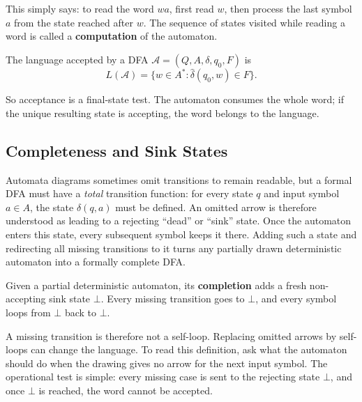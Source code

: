 This simply says: to read the word $wa$, first read $w$, then process the
last symbol $a$ from the state reached after $w$.
The sequence of states visited while reading a word is called a
\textbf{computation} of the automaton.

\begin{definition}
\label{def:dfa-language}
The language accepted by a DFA $\mathcal{A}=(Q,A,\delta,q_0,F)$ is
\[
  L(\mathcal{A})=\{w\in A^* : \widehat{\delta}(q_0,w)\in F\}.
\]
\end{definition}

So acceptance is a final-state test.  The automaton consumes the whole
word; if the unique resulting state is accepting, the word belongs to
the language.

\subsection{Completeness and Sink States}
\label{subsec:sink-state}

Automata diagrams sometimes omit transitions to remain readable, but a
formal DFA must have a \emph{total} transition function: for every state
$q$ and input symbol $a\in A$, the state $\delta(q,a)$ must be defined.
An omitted arrow is therefore understood as leading to a rejecting
``dead'' or ``sink'' state.  Once the automaton enters this state, every
subsequent symbol keeps it there.  Adding such a state and redirecting
all missing transitions to it turns any partially drawn deterministic
automaton into a formally complete DFA.

\begin{definition}
\label{def:sink-completion}
Given a partial deterministic automaton, its \textbf{completion} adds a
fresh non-accepting sink state $\bot$.  Every missing transition goes to
$\bot$, and every symbol loops from $\bot$ back to $\bot$.
\end{definition}

A missing transition is therefore not a self-loop.  Replacing omitted
arrows by self-loops can change the language.  To read this definition,
ask what the automaton should do when the drawing gives no arrow for the
next input symbol.  The operational test is simple: every missing case is
sent to the rejecting state $\bot$, and once $\bot$ is reached, the word
cannot be accepted.


